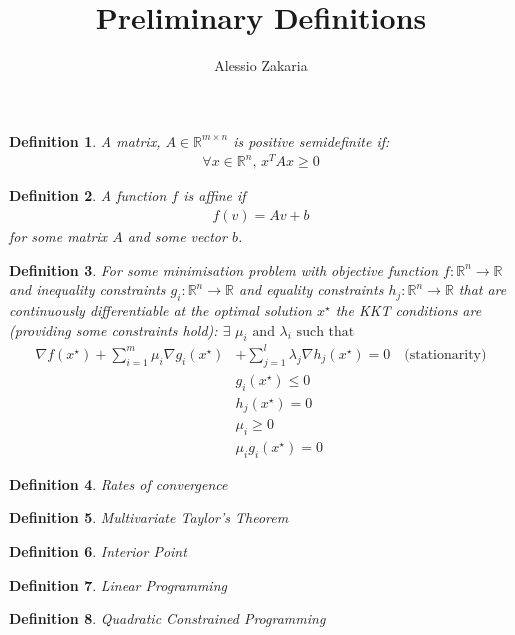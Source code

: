 \documentclass[a4paper,10pt]{article}
\date{}
\author{Alessio Zakaria}
\title{Preliminary Definitions\vspace{-30mm}}
\def\rnum{\mathbb{R}}
\newtheorem*{definition}{Definition}
\begin{document}
\maketitle
\begin{definition}
A matrix, $A \in \rnum^{m \times n}$ is positive semidefinite if:
\begin{align*}
    \forall     x \in \rnum^{n}, \, x^{T}Ax \geq 0
\end{align*}
\end{definition}
\begin{definition}
A function $f$ is affine if
\begin{align*}
    f(v) = Av + b
\end{align*} for some matrix $A$ and some vector $b$.
\end{definition}

\begin{definition}
    For some minimisation problem with objective function $f: \rnum^{n} \rightarrow \rnum$ and inequality
    constraints $g_{i}: \rnum^{n} \rightarrow \rnum$ and equality constraints
    $h_{j}: \rnum^{n} \rightarrow \rnum$ that are continuously differentiable at the optimal solution $x^{\star}$ the KKT conditions are (providing some constraints hold):
    $\exists \, \, \mu_{i} \text{ and }  \lambda_{i}\text{ such that}$
    \begin{align*}
        \nabla f(x^{\star}) + \sum\limits_{i=1}^{m}\mu_{i} \nabla g_{i}(x^{\star}) &+ \sum\limits_{j=1}^{l}\lambda_{j}\nabla h_{j}(x^{\star}) = 0 \,\,\,\, \,\, \text{(stationarity)}\\
        &g_{i}(x^{\star}) \leq 0 \\
        &h_{j}(x^{\star}) = 0 \\
        &\mu_{i} \geq 0 \\
        &\mu_{i}g_{i}(x^{\star}) = 0
    \end{align*}

    \label{a}
\end{definition}


\begin{definition}
    Rates of convergence
    \label{t}
\end{definition}

\begin{definition}
    Multivariate Taylor's Theorem
    \label{k}
\end{definition}

\begin{definition}
    Interior Point
    \label{<+label+>}
\end{definition}

\begin{definition}
    Linear Programming
    \label{m}
\end{definition}

\begin{definition}
    Quadratic Constrained Programming
    \label{
    }
\end{definition}
\end{document}
